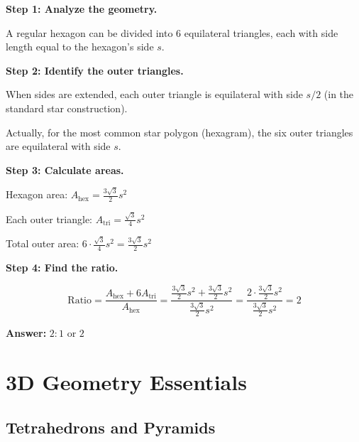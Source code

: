 ﻿\documentclass[12pt]{extarticle}
\begin{document}
\begin{solutionbox}
\textbf{Step 1: Analyze the geometry.}

A regular hexagon can be divided into 6 equilateral triangles, each with side length equal to the hexagon's side $s$.

\textbf{Step 2: Identify the outer triangles.}

When sides are extended, each outer triangle is equilateral with side $s/2$ (in the standard star construction).

Actually, for the most common star polygon (hexagram), the six outer triangles are equilateral with side $s$.

\textbf{Step 3: Calculate areas.}

Hexagon area: $A_{\text{hex}} = \frac{3\sqrt{3}}{2}s^2$

Each outer triangle: $A_{\text{tri}} = \frac{\sqrt{3}}{4}s^2$

Total outer area: $6 \cdot \frac{\sqrt{3}}{4}s^2 = \frac{3\sqrt{3}}{2}s^2$

\textbf{Step 4: Find the ratio.}

\[\text{Ratio} = \frac{A_{\text{hex}} + 6 A_{\text{tri}}}{A_{\text{hex}}} = \frac{\frac{3\sqrt{3}}{2}s^2 + \frac{3\sqrt{3}}{2}s^2}{\frac{3\sqrt{3}}{2}s^2} = \frac{2 \cdot \frac{3\sqrt{3}}{2}s^2}{\frac{3\sqrt{3}}{2}s^2} = 2\]

\textbf{Answer:} $\boxed{2:1}$ or $\boxed{2}$
\end{solutionbox}

\section{3D Geometry Essentials}

\subsection{Tetrahedrons and Pyramids}
\end{document}

